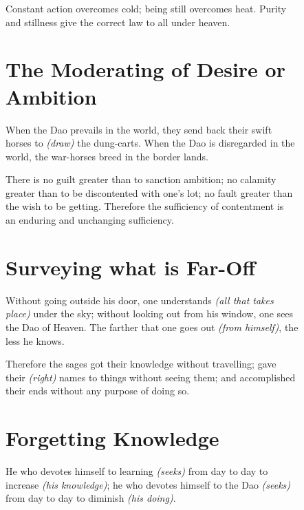    Constant action overcomes cold; being still overcomes heat. Purity\\
    and stillness give the correct law to all under heaven.\vspace{\baselineskip}
    
\section*{The Moderating of Desire or Ambition}
    When the Dao prevails in the world, they send back their swift\\
    horses to \textit{(draw)} the dung-carts. When the Dao is disregarded in the\\
    world, the war-horses breed in the border lands.\vspace{\baselineskip}
    
    There is no guilt greater than to sanction ambition; no calamity\\
    greater than to be discontented with one's lot; no fault greater than\\
    the wish to be getting. Therefore the sufficiency of contentment is\\
    an enduring and unchanging sufficiency.\vspace{\baselineskip}
    
\section*{Surveying what is Far-Off}
    Without going outside his door, one understands \textit{(all that takes\\
    place)} under the sky; without looking out from his window, one sees\\
    the Dao of Heaven. The farther that one goes out \textit{(from himself)}, the\\
    less he knows.\vspace{\baselineskip}
    
    Therefore the sages got their knowledge without travelling; gave\\
    their \textit{(right)} names to things without seeing them; and accomplished\\
    their ends without any purpose of doing so.\vspace{\baselineskip}
    
\section*{Forgetting Knowledge}
    He who devotes himself to learning \textit{(seeks)} from day to day to\\
    increase \textit{(his knowledge)}; he who devotes himself to the Dao \textit{(seeks)}\\
    from day to day to diminish \textit{(his doing)}.\vspace{\baselineskip}
    
